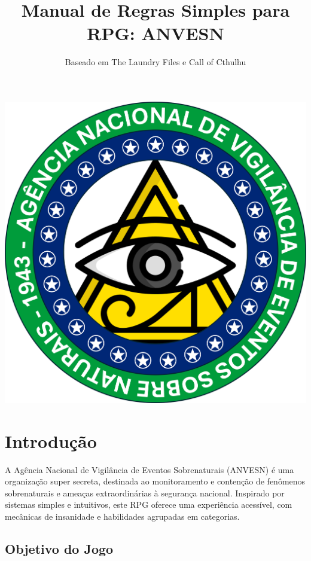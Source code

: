 \documentclass[a4paper,12pt]{book}
\title{Manual de Regras Simples para RPG: ANVESN}
\author{Baseado em The Laundry Files e Call of Cthulhu}
\date{}
\begin{document}
\maketitle

\begin{center}
\vspace*{\fill}
\includegraphics[scale=.9]{imagens/ANVESN_LOGO.png}
\vspace*{\fill}
\end{center}


\tableofcontents


\chapter{Introdução}

A Agência Nacional de Vigilância de Eventos Sobrenaturais (ANVESN) é uma organização super secreta, destinada ao monitoramento e contenção de fenômenos sobrenaturais e ameaças extraordinárias à segurança nacional. Inspirado por sistemas simples e intuitivos, este RPG oferece uma experiência acessível, com mecânicas de insanidade e habilidades agrupadas em categorias.

\section{Objetivo do Jogo}
\end{document}
